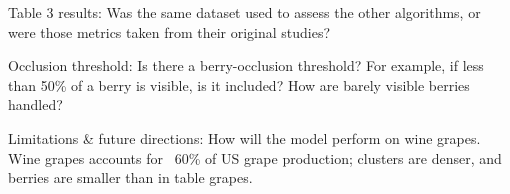 \documentclass{ar2rc}
\begin{document}
\begin{reviewercomment}
    Table 3 results: Was the same dataset used to assess the other algorithms, or were those metrics taken from their original studies?
\end{reviewercomment}




\begin{reviewercomment}
    Occlusion  threshold: Is there a berry-occlusion threshold? For example, if less  than 50\% of a berry is visible, is it included? How are barely visible  berries handled?
\end{reviewercomment}




\begin{reviewercomment}
    Limitations \& future directions: How will the  model perform on wine grapes. Wine grapes accounts for ~60\% of US grape  production; clusters are denser, and berries are smaller than in table grapes.
\end{reviewercomment}





\phantom{\cite{}} %

\renewcommand{\bibsection}{} %

\end{document}
